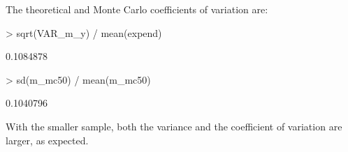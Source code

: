 \begin{Problem}[Simulation]
\begin{Subtask}
\begin{Solution}
        The theoretical and Monte Carlo coefficients of variation are:

\begin{Schunk}
\begin{Sinput}
> sqrt(VAR_m_y) / mean(expend)
\end{Sinput}
\begin{Soutput}
[1] 0.1084878
\end{Soutput}
\begin{Sinput}
> sd(m_mc50) / mean(m_mc50)
\end{Sinput}
\begin{Soutput}
[1] 0.1040796
\end{Soutput}
\end{Schunk}

        With the smaller sample, both the variance and the coefficient of
        variation are larger, as expected.
    \end{Solution}
\end{Subtask}
\end{Problem}
